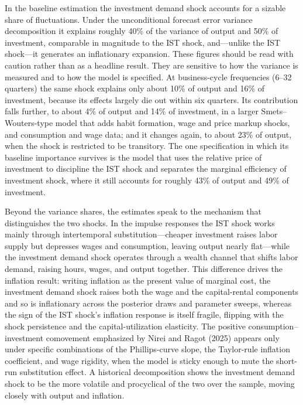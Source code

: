 \documentclass[12pt]{article}
\begin{document}
In the baseline estimation the investment demand shock accounts for a sizable share of fluctuations. Under the unconditional forecast error variance decomposition it explains roughly 40\% of the variance of output and 50\% of investment, comparable in magnitude to the IST shock, and---unlike the IST shock---it generates an inflationary expansion. These figures should be read with caution rather than as a headline result. They are sensitive to how the variance is measured and to how the model is specified. At business-cycle frequencies (6--32 quarters) the same shock explains only about 10\% of output and 16\% of investment, because its effects largely die out within six quarters. Its contribution falls further, to about 4\% of output and 14\% of investment, in a larger Smets--Wouters-type model that adds habit formation, wage and price markup shocks, and consumption and wage data; and it changes again, to about 23\% of output, when the shock is restricted to be transitory. The one specification in which its baseline importance survives is the model that uses the relative price of investment to discipline the IST shock and separates the marginal efficiency of investment shock, where it still accounts for roughly 43\% of output and 49\% of investment.

Beyond the variance shares, the estimates speak to the mechanism that distinguishes the two shocks. 
In the impulse responses the IST shock works mainly through intertemporal substitution---cheaper investment raises labor supply but depresses wages and consumption, leaving output nearly flat---while the investment demand shock operates through a wealth channel that shifts labor demand, raising hours, wages, and output together. 
This difference drives the inflation result: writing inflation as the present value of marginal cost, the investment demand shock raises both the wage and the capital-rental components and so is inflationary across the posterior draws and parameter sweeps, whereas the sign of the IST shock's inflation response is itself fragile, flipping with the shock persistence and the capital-utilization elasticity. 
The positive consumption--investment comovement emphasized by Nirei and Ragot (2025) appears only under specific combinations of the Phillips-curve slope, the Taylor-rule inflation coefficient, and wage rigidity, when the model is sticky enough to mute the short-run substitution effect. A historical decomposition shows the investment demand shock to be the more volatile and procyclical of the two over the sample, moving closely with output and inflation.
\end{document}
